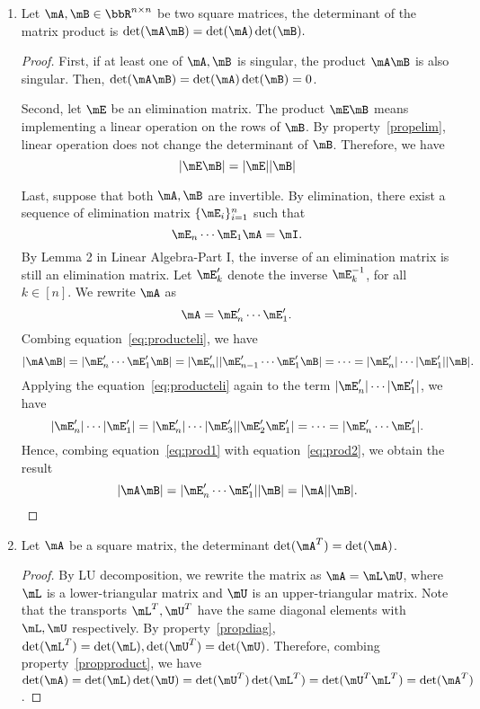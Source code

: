 \documentclass[11pt]{article}
\theoremstyle{plain}
\theoremstyle{definition}
\begin{document}
\begin{enumerate}
	
	\item\label{propproduct} Let  $\mA, \mB \in \bbR^{n \times n}$ be two square matrices, the determinant of the matrix product is $\det(\mA \mB) = \det(\mA) \det(\mB).$
	
	\begin{proof}
		First, if at least one of $\mA, \mB$ is singular, the product $\mA \mB$ is also singular. Then, $\det(\mA \mB) = \det(\mA) \det(\mB) = 0$. 
		
		Second, let $\mE$ be an elimination matrix. The product $\mE \mB$ means implementing a linear operation on the rows of $\mB$. By property~\ref{propelim}, linear operation does not change the determinant of $\mB$. Therefore, we have
		\begin{equation}\label{eq:producteli}
			|\mE \mB| = |\mE| |\mB|
		\end{equation}
		
		Last, suppose that both $\mA, \mB$ are invertible. By elimination, there exist a sequence of elimination matrix $\{ \mE_i \}_{i = 1}^n$ such that 
		\[ \mE_n \cdots \mE_1 \mA = \mI.  \]
		By Lemma 2 in Linear Algebra-Part I, the inverse of an elimination matrix is still an elimination matrix. Let $\mE'_k$ denote the inverse $\mE^{-1}_k$, for all $k \in [n]$. We rewrite $\mA$ as
		\[ \mA = \mE'_n \cdots \mE'_1. \]
		Combing equation~\eqref{eq:producteli}, we have
		\begin{equation}\label{eq:prod1}
			|\mA \mB| = | \mE'_n \cdots \mE'_1 \mB | = |\mE'_n| |\mE'_{n-1} \cdots \mE'_1 \mB| = \cdots = |\mE'_n|\cdots |\mE'_1||\mB|. 
		\end{equation}
		Applying the equation~\eqref{eq:producteli} again to the term $|\mE'_n|\cdots |\mE'_1| $, we have
		\begin{equation}\label{eq:prod2}
			|\mE'_n|\cdots |\mE'_1|  =|\mE'_n|\cdots |\mE'_3| |\mE'_2 \mE'_1| = \cdots = | \mE'_n \cdots \mE'_1|.
		\end{equation}
		Hence, combing equation~\eqref{eq:prod1} with equation~\eqref{eq:prod2}, we obtain the result 
		\[ |\mA \mB|  = | \mE'_n \cdots \mE'_1| |\mB| = |\mA| |\mB|.\]
	\end{proof}
	
	\item\label{proptrans} Let $\mA$ be a square matrix, the determinant $\det(\mA^T) = \det(\mA)$. 
	
	\begin{proof}
		By LU decomposition, we rewrite the matrix as $\mA = \mL \mU$, where $\mL$ is a lower-triangular matrix and $\mU$ is an upper-triangular matrix. Note that the transports $\mL^T,\mU^T$ have the same diagonal elements with $\mL, \mU$ respectively. By property~\ref{propdiag}, $\det(\mL^T)= \det(\mL),  \det(\mU^T) = \det(\mU)$. Therefore, combing property~\ref{propproduct}, we have  $\det(\mA) = \det(\mL) \det(\mU) = \det(\mU^T) \det(\mL^T) = \det(\mU^T \mL^T) = \det(\mA^T)$. 
			\end{proof}
\end{enumerate}
\end{document}
